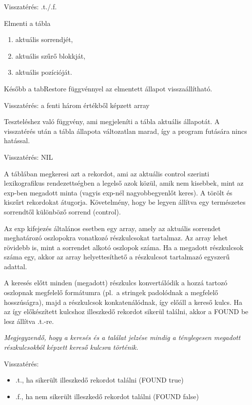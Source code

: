 Visszatérés: .t./.f.


Elmenti a tábla 
\begin{enumerate}
\item aktuális sorrendjét,
\item aktuális szűrő blokkját,
\item aktuális pozícióját.
\end{enumerate}
Később a tabRestore függvénnyel az elmentett állapot visszaállítható.

Visszatérés: a fenti három értékből képzett array


Teszteléshez való függvény, ami megjeleníti a tábla aktuális állapotát.
A visszatérés után a tábla állapota változatlan marad, így a program
futására nincs hatással.

Visszatérés: NIL
 


A táblában megkeresi azt a rekordot, ami az aktuális control szerinti
lexikografikus rendezettségben a legelső azok közül, amik nem kisebbek,
mint az exp-ben megadott minta (vagyis exp-nél nagyobbegyenlőt keres).
A törölt és kiszűrt rekordokat átugorja.
Követelmény, hogy be legyen állítva egy természetes sorrendtől 
különböző sorrend (control).

Az exp kifejezés általános esetben egy array, 
amely az aktuális sorrendet meghatározó oszlopokra vonatkozó 
részkulcsokat tartalmaz. Az array lehet rövidebb is, mint a sorrendet 
alkotó oszlopok száma. Ha a megadott részkulcsok száma egy, 
akkor az array helyettesíthető a részkulcsot tartalmazó 
egyszerű adattal.

A keresés előtt minden (megadott) részkulcs konvertálódik a hozzá tartozó
oszlopnak megfelelő formátumra (pl.\  a stringek padolódnak a megfelelő
hosszúságra), majd a részkulcsok konkatenálódnak, így előáll a kereső kulcs.
Ha az így előkészített kulcshoz illeszkedő rekordot sikerül találni,
akkor a FOUND be lesz állítva .t.-re. 

{\em Megjegyzendő, hogy a keresés és a találat jelzése mindig 
a ténylegesen megadott részkulcsokból képzett kereső kulcsra történik.}

Visszatérés:
\begin{itemize}
\item .t., ha sikerült illeszkedő rekordot találni (FOUND true)  
\item .f., ha nem sikerült illeszkedő rekordot találni (FOUND false)   
\end{itemize}
 

